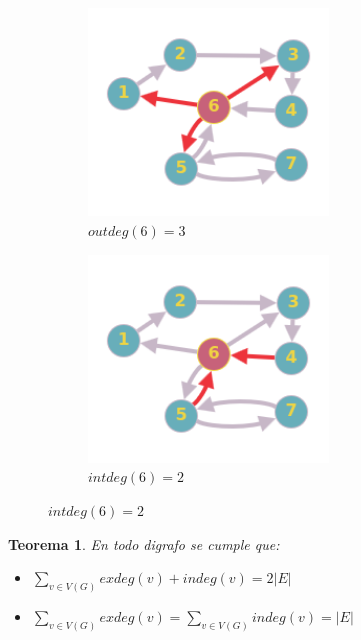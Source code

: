 \documentclass[a4paper,1pt]{report}
\newtheorem*{teo}{Teorema}
\begin{document}
\begin{figure}[H]
    \centering
    \begin{subfigure}[b]{0.45\textwidth}
        \centering
        \includegraphics[width=0.7\textwidth]{figures8/outdeg.png}
        \caption{$outdeg(6) = 3$}
    \end{subfigure} 
        \begin{subfigure}[b]{0.45\textwidth}
        \centering
        \includegraphics[width=0.7\textwidth]{figures8/indeg.png}
        \caption{$intdeg(6) = 2$}
         \end{subfigure} 
\end{figure} 

\begin{teo}
 En todo digrafo se cumple que:
 \begin{itemize}
  \item $\sum_{v \in V(G)}exdeg(v)+indeg(v)=2|E|$
  \item $\sum_{v \in V(G)}exdeg(v)=\sum_{v \in V(G)}indeg(v)=|E|$
 \end{itemize}

\end{teo}
\end{document}
